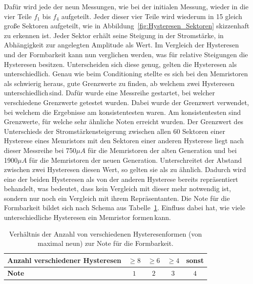 Dafür wird jede der neun Messungen, wie bei der initialen Messung, wieder in die vier Teile $f_1$ bis $f_4$ aufgeteilt. Jeder dieser vier Teile wird wiederum in 15 gleich große Sektoren aufgeteilt, wie in Abbildung~\ref{fig:Hysteresen_Sektoren} skizzenhaft zu erkennen ist. Jeder Sektor erhält seine Steigung in der Stromstärke, in Abhängigkeit zur angelegten Amplitude als Wert. Im Vergleich der Hysteresen und der Formbarkeit kann nun verglichen werden, was für relative Steigungen die Hysteresen besitzen. Unterscheiden sich diese \glqq genug\grqq, gelten die Hysteresen als unterschiedlich. Genau wie beim Conditioning stellte es sich bei den Memristoren als schwierig heraus, gute Grenzwerte zu finden, ab welchem zwei Hysteresen \glqq unterschiedlich\grqq\,sind. Dafür wurde eine Messreihe gestartet, bei welcher verschiedene Grenzwerte getestet wurden. Dabei wurde der Grenzwert verwendet, bei welchem die Ergebnisse am konsistentesten waren. Am konsistentesten sind Grenzwerte, für welche sehr ähnliche Noten erreicht wurden. Der Grenzwert des Unterschieds der Stromstärkensteigerung zwischen allen 60 Sektoren einer Hysterese eines Memristors mit den Sektoren einer anderen Hysterese liegt nach dieser Messreihe bei 750$\mu A$ für die Memristoren der alten Generation und bei 1900$\mu A$ für die Memristoren der neuen Generation. Unterschreitet der Abstand zwischen zwei Hysteresen diesen Wert, so gelten sie als \glqq zu ähnlich\grqq. Dadurch wird eine der beiden Hysteresen als von der anderen Hysterese \glqq bereits repräsentiert\grqq\,behandelt, was bedeutet, dass kein Vergleich mit dieser mehr notwendig ist, sondern nur noch ein Vergleich mit ihrem Repräsentanten. Die Note für die Formbarkeit bildet sich nach Schema aus Tabelle~\ref{tab:Formbarkeitsnote}. Einfluss dabei hat, wie viele unterschiedliche Hysteresen ein Memristor \glqq formen\grqq\,kann.

\begin{table}
  \centering
    \begin{tabular}{l|c|c|c|c}
      \textbf{Anzahl verschiedener Hysteresen} & $\geq 8$ & $\geq 6$ & $\geq 4$ & sonst \\\hline
      \textbf{Note}          & $1$      & $2$      & $3$      & $4$
    \end{tabular}
  \caption{Verhältnis der Anzahl von verschiedenen Hysteresenformen (von maximal neun) zur Note für die Formbarkeit.}
  \label{tab:Formbarkeitsnote}
\end{table}

